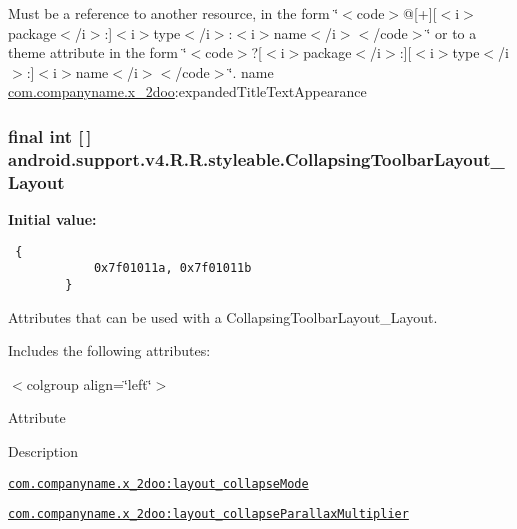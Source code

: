 Must be a reference to another resource, in the form \char`\"{}$<$code$>$@\mbox{[}+\mbox{]}\mbox{[}$<$i$>$package$<$/i$>$:\mbox{]}$<$i$>$type$<$/i$>$:$<$i$>$name$<$/i$>$$<$/code$>$\char`\"{} or to a theme attribute in the form \char`\"{}$<$code$>$?\mbox{[}$<$i$>$package$<$/i$>$:\mbox{]}\mbox{[}$<$i$>$type$<$/i$>$:\mbox{]}$<$i$>$name$<$/i$>$$<$/code$>$\char`\"{}.  name \hyperlink{namespacecom_1_1companyname_1_1x__2doo}{com.companyname.x\_\-2doo}:expandedTitleTextAppearance \hypertarget{classandroid_1_1support_1_1v4_1_1_r_1_1styleable_6906c73a21feed9a1c451f787d6f3059}{
\subsubsection[{CollapsingToolbarLayout\_\-Layout}]{\setlength{\rightskip}{0pt plus 5cm}final int \mbox{[}$\,$\mbox{]} android.support.v4.R.R.styleable.CollapsingToolbarLayout\_\-Layout}}
\label{classandroid_1_1support_1_1v4_1_1_r_1_1styleable_6906c73a21feed9a1c451f787d6f3059}


\textbf{Initial value:}

\begin{Code}\begin{verbatim} {
            0x7f01011a, 0x7f01011b
        }
\end{verbatim}
\end{Code}
Attributes that can be used with a CollapsingToolbarLayout\_\-Layout. 

Includes the following attributes: \begin{TabularC}{0}
\hline
\end{TabularC}
$<$colgroup align=\char`\"{}left\char`\"{}$>$ 

Attribute

Description 

{\tt \hyperlink{classandroid_1_1support_1_1v4_1_1_r_1_1styleable_0a4d753a9146e42fa452216511bb60bd}{com.companyname.x\_\-2doo:layout\_\-collapseMode}}

{\tt \hyperlink{classandroid_1_1support_1_1v4_1_1_r_1_1styleable_d364fcfe501be0099ffef1f05abd61c9}{com.companyname.x\_\-2doo:layout\_\-collapseParallaxMultiplier}}

